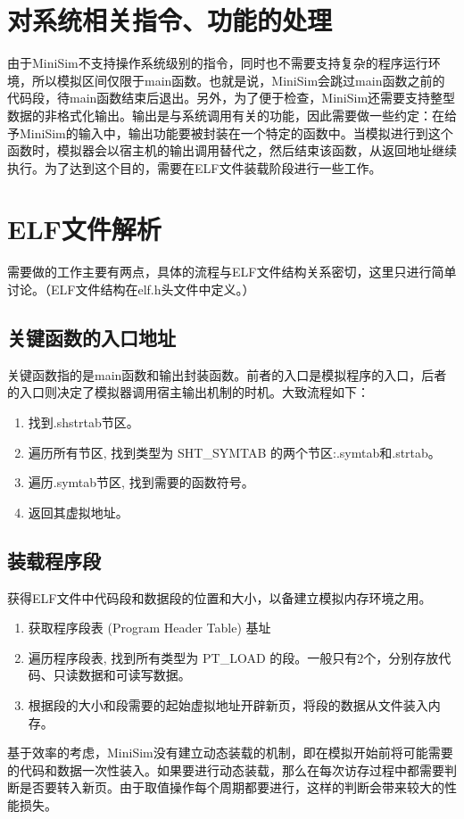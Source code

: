 \documentclass[12pt,a4paper,Flow]{report}
\begin{document}
\section{对系统相关指令、功能的处理}
由于MiniSim不支持操作系统级别的指令，同时也不需要支持复杂的程序运行环境，所以模拟区间仅限于main函数。也就是说，MiniSim会跳过main函数之前的代码段，待main函数结束后退出。另外，为了便于检查，MiniSim还需要支持整型数据的非格式化输出。输出是与系统调用有关的功能，因此需要做一些约定：在给予MiniSim的输入中，输出功能要被封装在一个特定的函数中。当模拟进行到这个函数时，模拟器会以宿主机的输出调用替代之，然后结束该函数，从返回地址继续执行。为了达到这个目的，需要在ELF文件装载阶段进行一些工作。
\section{ELF文件解析}
需要做的工作主要有两点，具体的流程与ELF文件结构关系密切，这里只进行简单讨论。（ELF文件结构在elf.h头文件中定义。）
\subsection{关键函数的入口地址}
关键函数指的是main函数和输出封装函数。前者的入口是模拟程序的入口，后者的入口则决定了模拟器调用宿主输出机制的时机。大致流程如下：
\begin{enumerate}
\item 找到.shstrtab节区。
\item 遍历所有节区, 找到类型为 SHT\_SYMTAB 的两个节区:.symtab和.strtab。
\item 遍历.symtab节区, 找到需要的函数符号。
\item 返回其虚拟地址。
\end{enumerate}
\subsection{装载程序段}
获得ELF文件中代码段和数据段的位置和大小，以备建立模拟内存环境之用。
\begin{enumerate}
\item 获取程序段表 (Program Header Table) 基址
\item 遍历程序段表, 找到所有类型为 PT\_LOAD 的段。一般只有2个，分别存放代码、只读数据和可读写数据。
\item 根据段的大小和段需要的起始虚拟地址开辟新页，将段的数据从文件装入内存。
\end{enumerate}
基于效率的考虑，MiniSim没有建立动态装载的机制，即在模拟开始前将可能需要的代码和数据一次性装入。如果要进行动态装载，那么在每次访存过程中都需要判断是否要转入新页。由于取值操作每个周期都要进行，这样的判断会带来较大的性能损失。
\end{document}
